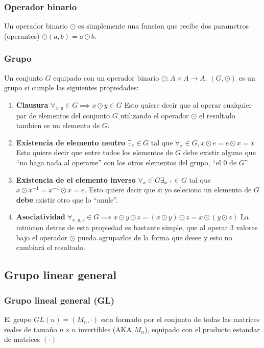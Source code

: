 \subsubsection{Operador binario}
Un operador binario $\odot$ es simplemente una funcion que recibe dos parametros
(operantes) $\odot(a, b) = a \odot b$.
\subsubsection{Grupo}
Un conjunto $G$ equipado con un operador binario $\odot : A \times A \to A$. $(G, \odot)$ es un
grupo si cumple las siguientes propiedades:
\begin{enumerate}
\item \textbf{Clausura} $\forall_{x, y} \in G \implies x \odot y \in G$ Esto quiere decir que
  al operar   cualquier par de elementos del conjunto $G$ utilizando el operador
  $\odot$ el resultado tambien es un elemento de $G$.
\item \textbf{Existencia de elemento neutro} $\exists_e \in G$ tal que $\forall_x \in G, x \odot e = e \odot x = x$
  Esto quiere decir que entre todos los elementos de $G$ debe existir alguno que
  ``no haga   nada al operarse'' con los otros elementos del grupo, ``el 0 de
  $G$''.
\item \textbf{Existencia de el elemento inverso} $\forall_x \in G \exists_{x^{-1}} \in G$ tal que
  $x \odot x^{-1} = x^{-1} \odot x = e$. Esto quiere decir que si yo seleciono un elemento de $G$
  \textbf{debe} existir otro que lo ``anule''.
\item \textbf{Asociatividad} $\forall_{x, y, z} \in G \implies x \odot y \odot z = (x \odot y) \odot z = x \odot (y \odot z)$
  La intuicion detras de esta propiedad es bastante simple, que al operar $3$
  valores bajo el operador $\odot$ pueda agruparlos de la forma que desee y esto no
  cambiará el resultado.
\end{enumerate}

\subsection{Grupo linear general}
\subsubsection{Grupo lineal general (GL)}
El grupo $GL(n) = (M_n, \cdot)$ esta formado por el conjunto de todas las matrices
reales de tamaño $n \times n$ invertibles (AKA $M_n$), equipado con el producto
estandar de matrices $(\cdot)$

